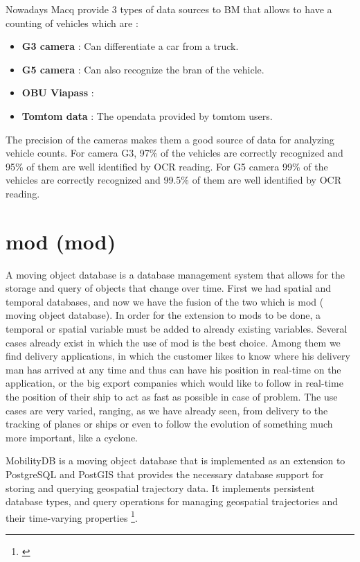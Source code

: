 \documentclass[12pt]{report}
\begin{document}
	Nowadays Macq provide 3 types of data sources to BM that allows to have a counting of vehicles which are : 
	\begin{itemize}[noitemsep]
		\item \textbf{G3 camera} : Can differentiate a car from a truck.
		\item \textbf{G5 camera} : Can also recognize the bran of the vehicle.
		\item \textbf{OBU Viapass} : 
		\item \textbf{Tomtom data} : The opendata provided by tomtom users. 
	\end{itemize}
	
	The precision of the cameras makes them a good source of data for analyzing vehicle counts. For camera G3, 97\% of the vehicles are correctly recognized and 95\% of them are well identified by OCR reading. For G5 camera 99\% of the vehicles are correctly recognized and 99.5\% of them are well identified by OCR reading.

	\section{\acrlong{mod} (\acrshort{mod})}
	\label{sec:MobilityDB-section}
	A moving object database is a database management system that allows for the storage and query of objects that change over time. First we had spatial and temporal databases, and now we have the fusion of the two which is \acrshort{mod} ( moving object database). 
	In order for the extension to \acrshort{mod}s to be done, a temporal or spatial variable must be added to already existing variables. Several cases already exist
	in which the use of \acrshort{mod} is the best choice. Among them we find delivery applications, in which the customer likes to know where his delivery man has arrived at any time and thus can have his position in real-time on the application, or the big export companies which would like to follow in real-time the position of their ship to act as fast as possible in case of problem.
	The use cases are very varied, ranging, as we have already seen, from delivery to the tracking of planes or ships or even to follow the evolution of something much more important, like a cyclone.
	
	MobilityDB is a moving object database that is implemented as an extension to PostgreSQL and PostGIS that provides the necessary database support for storing and querying geospatial trajectory data. It implements persistent database types, and query operations for managing geospatial trajectories and their time-varying properties \footnote{\cite{MobilityDBTODS2020}}. 
	
\end{document}
